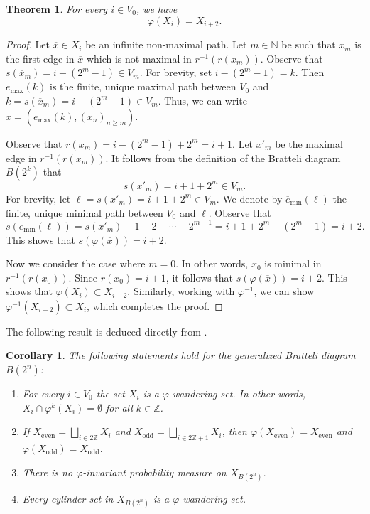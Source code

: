 \documentclass[11pt,reqno]{amsart}
\theoremstyle{definition}
\theoremstyle{remark}
\theoremstyle{plain}
\newtheorem{theorem}[definition]{Theorem}
\newtheorem{corol}[definition]{Corollary}
\def\ol{\overline}
\newcommand{\N}{\mathbb N}
\newcommand{\Z}{\mathbb Z}
\numberwithin{equation}{section}
\begin{document}
\begin{theorem}\label{Th: X_i_2}
For every $i \in V_0$, we have \[\varphi(X_i) =  X_{i+2}.\]    
\end{theorem} 

\begin{proof} Let $\ol x \in X_i$ be an infinite non-maximal path. Let $m \in \N$ be such that $x_m$ is the first edge in $\ol x$ which is not maximal in $r^{-1} (r(x_m))$. Observe that $s(\ol x_m) = i - (2^m-1) \in V_m$. For brevity, set $i - (2^m-1) = k$. Then $\ol e_{\mathrm{max}}(k)$ is the finite, unique maximal path between $V_0$ and $k = s(\ol x_m) = i - (2^m-1) \in V_m$. Thus, we can write $\ol x = (\ol e_{\mathrm{max}}(k),(x_n)_{n \geq m})$. 

Observe that $r(x_m) = i - (2^m-1) + 2^m = i+1$. Let $x'_m $ be the maximal edge in $r^{-1} (r(x_m))$. It follows from the definition of the Bratteli diagram $B(2^k)$ that
\[
s(x'_m) = i+1 + 2^m \in V_m.
\] For brevity, let $\ell = s(x'_m) =  i+1 + 2^m \in V_m$. We denote by $\ol e_{\mathrm{min}} (\ell)$ the finite, unique minimal path between $V_0$ and $\ell$. Observe that
\[
s(e_{\mathrm{min}} (\ell)) = s(x'_m) - 1-2- \cdots - 2^{m-1} = i+1 + 2^m - (2^m - 1) = i+2.
\] 
This shows that $s(\varphi (\ol x)) = i+2$. 

Now we consider the case where $m = 0$. In other words, $x_0$ is minimal in $r^{-1}(r(x_0))$. Since $r(x_0) = i+1$, it follows that $s(\varphi (\ol x)) = i+2$. This shows that $\varphi(X_i) \subset  X_{i+2}$. Similarly, working with $\varphi^{-1}$, we can show $\varphi^{-1}(X_{i+2}) \subset  X_{i}$, which completes the proof. 
    \end{proof} 

The following result is deduced directly from . 

\begin{corol}\label{cor: phi_wander} The following statements hold for the generalized Bratteli diagram $B(2^n)$:
\begin{enumerate}
    \item For every $i \in V_0$ the set $X_i$ is a $\varphi$-wandering set. In other words, $X_i \cap \varphi^k(X_i) = \emptyset$ for all $k \in \Z$. 
    \item If $X_{\mathrm{even}} = \underset{i\in 2\Z}{\bigsqcup}X_i$ and $X_{\mathrm{odd}} = \underset{i\in 2\Z+1}{\bigsqcup}X_i$, then $\varphi(X_{\mathrm{even}}) = X_{\mathrm{even}}$ and $\varphi(X_{\mathrm{odd}}) = X_{\mathrm{odd}}$. 
    \item There is no $\varphi$-invariant probability measure on $X_{B(2^n)}$.
    \item Every cylinder set in $X_{B(2^n)}$ is a 
       $\varphi$-wandering set. 
\end{enumerate} 
\end{corol} 
\end{document}
